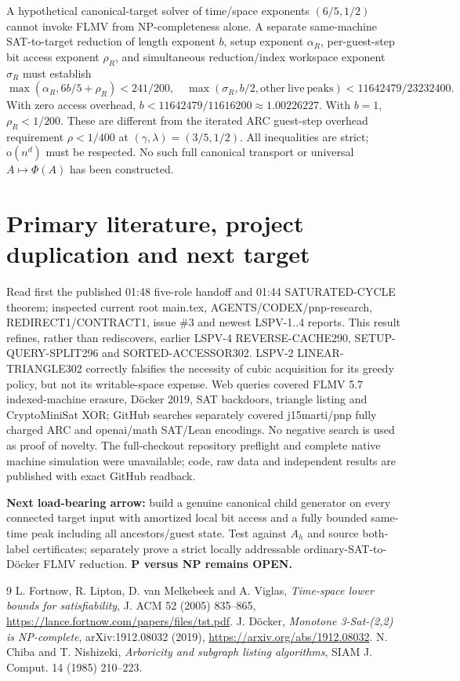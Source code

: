 \documentclass[11pt]{article}
\begin{document}
A hypothetical canonical-target solver of time/space exponents $(6/5,1/2)$ cannot invoke FLMV from NP-completeness alone. A separate same-machine SAT-to-target reduction of length exponent $b$, setup exponent $\alpha_R$, per-guest-step bit access exponent $\rho_R$, and simultaneous reduction/index workspace exponent $\sigma_R$ must establish
\[
\max(\alpha_R,6b/5+\rho_R)<241/200,\quad
\max(\sigma_R,b/2,\mathrm{other\ live\ peaks})<11642479/23232400.
\]
With zero access overhead, $b<11642479/11616200\approx1.00226227$. With $b=1$, $\rho_R<1/200$. These are different from the iterated ARC guest-step overhead requirement $\rho<1/400$ at $(\gamma,\lambda)=(3/5,1/2)$. All inequalities are strict; $\mathrm{o}(n^d)$ must be respected. No such full canonical transport or universal $A\mapsto\Phi(A)$ has been constructed.

\section{Primary literature, project duplication and next target}
Read first the published 01:48 five-role handoff and 01:44 SATURATED-CYCLE theorem; inspected current root main.tex, AGENTS/CODEX/pnp-research, REDIRECT1/CONTRACT1, issue \#3 and newest LSPV-1..4 reports. This result refines, rather than rediscovers, earlier LSPV-4 REVERSE-CACHE290, SETUP-QUERY-SPLIT296 and SORTED-ACCESSOR302. LSPV-2 LINEAR-TRIANGLE302 correctly falsifies the necessity of cubic acquisition for its greedy policy, but not its writable-space expense. Web queries covered FLMV 5.7 indexed-machine erasure, D\"ocker 2019, SAT backdoors, triangle listing and CryptoMiniSat XOR; GitHub searches separately covered j15marti/pnp fully charged ARC and openai/math SAT/Lean encodings. No negative search is used as proof of novelty. The full-checkout repository preflight and complete native machine simulation were unavailable; code, raw data and independent results are published with exact GitHub readback.

\noindent\textbf{Next load-bearing arrow:} build a genuine canonical child generator on every connected target input with amortized local bit access and a fully bounded same-time peak including all ancestors/guest state. Test against $A_h$ and source both-label certificates; separately prove a strict locally addressable ordinary-SAT-to-D\"ocker FLMV reduction. \textbf{P versus NP remains OPEN.}
\begin{thebibliography}{9}
 L. Fortnow, R. Lipton, D. van Melkebeek and A. Viglas, \emph{Time-space lower bounds for satisfiability}, J. ACM 52 (2005) 835--865, \url{https://lance.fortnow.com/papers/files/tst.pdf}.
 J. D\"ocker, \emph{Monotone 3-Sat-(2,2) is NP-complete}, arXiv:1912.08032 (2019), \url{https://arxiv.org/abs/1912.08032}.
 N. Chiba and T. Nishizeki, \emph{Arboricity and subgraph listing algorithms}, SIAM J. Comput. 14 (1985) 210--223.
\end{thebibliography}
\end{document}
